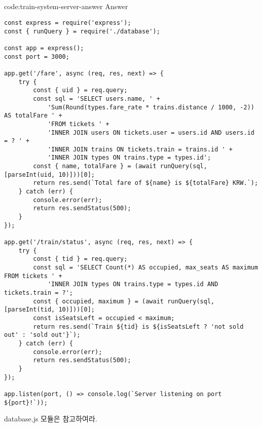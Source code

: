 \subsection*{}

\begin{codeenv}{code:train-system-server-answer}{ Answer}\begin{verbatim}
const express = require('express');
const { runQuery } = require('./database');

const app = express();
const port = 3000;

app.get('/fare', async (req, res, next) => {
    try {
        const { uid } = req.query;
        const sql = 'SELECT users.name, ' +
            'Sum(Round(types.fare_rate * trains.distance / 1000, -2)) AS totalFare ' +
            'FROM tickets ' +
            'INNER JOIN users ON tickets.user = users.id AND users.id = ? ' +
            'INNER JOIN trains ON tickets.train = trains.id ' +
            'INNER JOIN types ON trains.type = types.id';
        const { name, totalFare } = (await runQuery(sql, [parseInt(uid, 10)]))[0];
        return res.send(`Total fare of ${name} is ${totalFare} KRW.`);
    } catch (err) {
        console.error(err);
        return res.sendStatus(500);
    }
});

app.get('/train/status', async (req, res, next) => {
    try {
        const { tid } = req.query;
        const sql = 'SELECT Count(*) AS occupied, max_seats AS maximum FROM tickets ' +
            'INNER JOIN types ON trains.type = types.id AND tickets.train = ?';
        const { occupied, maximum } = (await runQuery(sql, [parseInt(tid, 10)]))[0];
        const isSeatsLeft = occupied < maximum;
        return res.send(`Train ${tid} is ${isSeatsLeft ? 'not sold out' : 'sold out'}`);
    } catch (err) {
        console.error(err);
        return res.sendStatus(500);
    }
});

app.listen(port, () => console.log(`Server listening on port ${port}!`));
\end{verbatim}
\end{codeenv}

database.js 모듈은 \과 \를 참고하여라.
